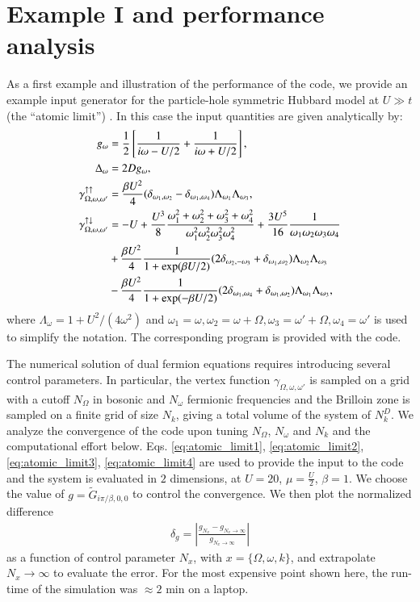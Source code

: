 \documentclass[3p,times,procedia]{elsarticle}
\begin{document}
\section{Example I and performance analysis}\label{sec:perf}
As a first example and illustration of the performance of the code, we provide an example input generator for the particle-hole symmetric Hubbard model at $U \gg t$ (the  ``atomic limit'') . In this case the input quantities are given analytically by:
\begin{align}\label{eq:atomic_limit1}
g_{\omega} & = \frac{1}{2}\left[\frac{1}{i\omega - U/2} + \frac{1}{i\omega + U/2}\right], \\
\Delta_{\omega} & = 2Dg_{\omega}, \label{eq:atomic_limit2} \\ 
\gamma^{\uparrow\uparrow}_{\Omega,\omega,\omega'} & = \frac{\beta U^2}{4} (\delta_{\omega_1,\omega_2} - \delta_{\omega_1,\omega_4} ) \Lambda_{\omega_1}\Lambda_{\omega_3}, \label{eq:atomic_limit3} \\ 
\label{eq:atomic_limit4}
\gamma^{\uparrow\downarrow}_{\Omega,\omega,\omega'} & = -U + 
\frac{U^3}{8}\frac{\omega_1^2 + \omega_2^2 + \omega_3^2 + \omega_4^2}{\omega_1^2\omega_2^2\omega_3^2\omega_4^2} + \frac{3U^5}{16}\frac{1}{\omega_1\omega_2\omega_3\omega_4}  \\
& \notag + \frac{\beta U^2}{4} \frac{1}{1 + \exp(\beta U /2 )} 
(2\delta_{ \omega_2, -\omega_3} + \delta_{\omega_1, \omega_2}) 
\Lambda_{\omega_2} \Lambda_{\omega_3}  \\ 
& \notag - \frac{\beta U^2}{4} \frac{1}{1 + \exp(-\beta U /2 )} 
(2\delta_{ \omega_1, \omega_4} + \delta_{\omega_1, \omega_2}) 
\Lambda_{\omega_1} \Lambda_{\omega_3},
\end{align}
where $\Lambda_\omega = 1 + U^2/(4\omega^2)$ and  $\omega_1 = \omega, \omega_2 = \omega + \Omega, \omega_3 = \omega' + \Omega, \omega_4 = \omega'$ is used to simplify the notation. The corresponding program is provided with the code. 

The numerical solution of dual fermion equations requires introducing several control parameters. In particular,
the vertex function $\gamma_{\Omega,\omega,\omega'}$ is sampled on a grid with a cutoff $N_\Omega$ in bosonic and $N_{\omega}$ fermionic frequencies and the Brilloin zone is sampled on a finite grid of size $N_k$, giving a total volume of the system of $N_k^D$. We analyze the convergence of the code upon tuning $N_{\Omega}$, $N_{\omega}$ and $N_k$ and the computational effort below. Eqs. \ref{eq:atomic_limit1}, \ref{eq:atomic_limit2}, \ref{eq:atomic_limit3}, \ref{eq:atomic_limit4} are used to provide the input to the code and the system is evaluated in $2$ dimensions, at $U=20$, $\mu = \frac{U}{2}$, $\beta = 1$. We choose the value of $g= \tilde G_{i\pi / \beta, 0, 0}$ to control the convergence. We then plot the normalized difference 
\begin{align}\label{eqn:deltag}
\delta_{g} = \left|\frac{g_{N_x} - g_{N_x \to \infty}}{g_{N_x \to \infty}}\right|
\end{align}
 as a function of control parameter $N_x$, with $x = \{ \Omega, \omega, k \}$, and extrapolate  $N_x \to \infty$ 
to evaluate the error. For the most expensive point shown here, the run-time of the simulation was $\approx 2$ min on a laptop.
\end{document}
